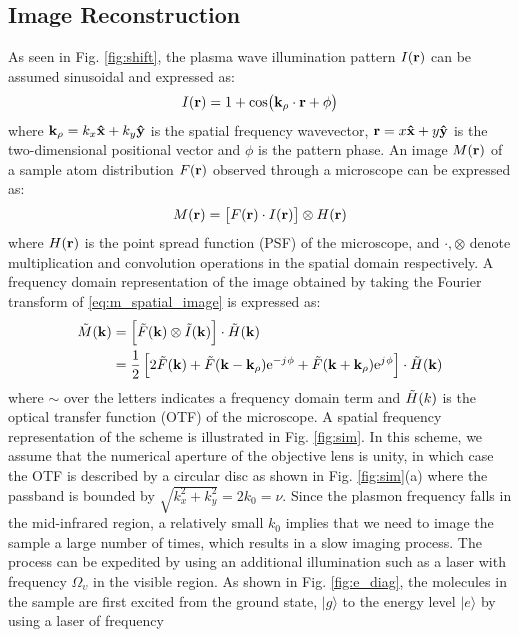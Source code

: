 \documentclass[12pt]{article}
\begin{document}
\subsection{Image Reconstruction}
%
As seen in Fig. \ref{fig:shift}, the plasma wave illumination pattern $I(\mathbf{r})$ can be assumed sinusoidal and expressed as:
%
\begin{equation}
  I(\mathbf{r}) = 1 + \cos(\mathbf{k}_{\rho} \cdot \mathbf{r} + \phi)
  \label{eq:intensity}
\end{equation}
where $\mathbf{k}_{\rho} = k_x \mathbf{\hat{x}} + k_y \mathbf{\hat{y}}$ is the spatial frequency wavevector,  $\mathbf{r} = x \mathbf{\hat{x}} +  y \mathbf{\hat{y}}$ is the two-dimensional positional vector and $\phi$ is the pattern phase. An image $M(\mathbf{r})$ of a sample atom distribution $F(\mathbf{r})$ observed through a microscope can be expressed as:
%
\begin{equation}
  M(\mathbf{r}) = \left[ F(\mathbf{r}) \cdot I(\mathbf{r}) \right] \otimes H(\mathbf{r})
  \label{eq:m_spatial_image}
\end{equation}
%
where $H(\mathbf{r})$ is the point spread function (PSF) of the microscope, and $\cdot, \otimes$ denote multiplication and convolution operations in the spatial domain respectively. A frequency domain representation of the image obtained by taking the Fourier transform of \eqref{eq:m_spatial_image} is expressed as:
%
\begin{equation}
  \begin{split}
    \tilde{M}(\mathbf{k}) &= \left[ \tilde{F}(\mathbf{k}) \otimes \tilde{I}(\mathbf{k}) \right] \cdot \tilde{H}(\mathbf{k}) \\
     &= \frac{1}{2} \left[ 2\tilde{F}(\mathbf{k}) + \tilde{F}(\mathbf{k} - \mathbf{k}_{\rho}) \mathrm{e}^{- j\mkern1mu \phi} + \tilde{F}(\mathbf{k} + \mathbf{k}_{\rho}) \mathrm{e}^{j\mkern1mu \phi} \right] \cdot \tilde{H}(\mathbf{k})
  \end{split}
  \label{eq:m_ft}
\end{equation}
%
where $\sim$ over the letters indicates a frequency domain term and $\tilde{H}(k)$ is the optical transfer function (OTF) of the microscope. A spatial frequency representation of the scheme is illustrated in Fig. \ref{fig:sim}. In this scheme, we assume that the numerical aperture of the objective lens is unity, in which case the OTF is described by a circular disc as shown in Fig. \ref{fig:sim}(a) where the passband is bounded by $\sqrt{k_x^2 + k_y^2} = 2 k_{0} = \nu$. Since the plasmon frequency falls in the mid-infrared region, a relatively small $k_0$ implies that we need to image the sample a large number of times, which results in a slow imaging process. The process can be expedited by using an additional illumination such as a laser with frequency $\Omega_{\upsilon}$ in the visible region. As shown in Fig. \ref{fig:e_diag}, the molecules in the sample are first excited from the ground state, $|g\rangle$ to the energy level $|e\rangle$ by using a laser of frequency
\end{document}
